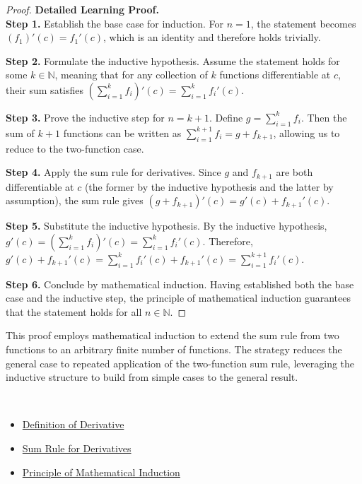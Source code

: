 \begin{proof}
\textbf{Detailed Learning Proof.}~\\

\textbf{Step 1.} Establish the base case for induction. For $n=1$, the statement becomes $(f_1)'(c) = f_1'(c)$, which is an identity and therefore holds trivially.

\textbf{Step 2.} Formulate the inductive hypothesis. Assume the statement holds for some $k \in \mathbb{N}$, meaning that for any collection of $k$ functions differentiable at $c$, their sum satisfies $\left( \sum_{i=1}^{k} f_i \right)'(c) = \sum_{i=1}^{k} f_i'(c)$.

\textbf{Step 3.} Prove the inductive step for $n = k+1$. Define $g = \sum_{i=1}^{k} f_i$. Then the sum of $k+1$ functions can be written as $\sum_{i=1}^{k+1} f_i = g + f_{k+1}$, allowing us to reduce to the two-function case.

\textbf{Step 4.} Apply the sum rule for derivatives. Since $g$ and $f_{k+1}$ are both differentiable at $c$ (the former by the inductive hypothesis and the latter by assumption), the sum rule gives $(g + f_{k+1})'(c) = g'(c) + f_{k+1}'(c)$.

\textbf{Step 5.} Substitute the inductive hypothesis. By the inductive hypothesis, $g'(c) = \left( \sum_{i=1}^{k} f_i \right)'(c) = \sum_{i=1}^{k} f_i'(c)$. Therefore, $g'(c) + f_{k+1}'(c) = \sum_{i=1}^{k} f_i'(c) + f_{k+1}'(c) = \sum_{i=1}^{k+1} f_i'(c)$.

\textbf{Step 6.} Conclude by mathematical induction. Having established both the base case and the inductive step, the principle of mathematical induction guarantees that the statement holds for all $n \in \mathbb{N}$.
\end{proof}

\begin{remark*}
This proof employs mathematical induction to extend the sum rule from two functions to an arbitrary finite number of functions. The strategy reduces the general case to repeated application of the two-function sum rule, leveraging the inductive structure to build from simple cases to the general result.
\end{remark*}

\begin{remark*}[Dependencies]~\\
\begin{itemize}
  \item \hyperref[def:derivative]{Definition of Derivative}
  \item \hyperref[thm:sum-rule]{Sum Rule for Derivatives}
  \item \hyperref[thm:mathematical-induction]{Principle of Mathematical Induction}
\end{itemize}
\end{remark*}